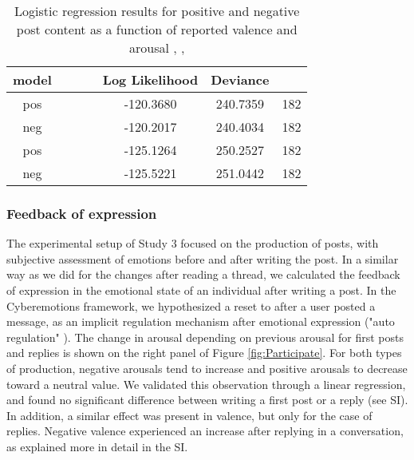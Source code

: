 \documentclass[nologo,url,11pt,a4paper]{ETHpaper}
\begin{document}
\begin{table}[!ht]
\centering

\begin{tabular}{ c | c  c  c  | c c c }
model &  					&  &  & Log Likelihood & Deviance  &    \\ \hline 
pos   &  	&   & &  -120.3680 &  240.7359 & 182 \\
neg   &                 &  & &  -120.2017 & 240.4034 & 182 \\
pos   &   &  &  & -125.1264 & 250.2527 & 182 \\
neg   &   &  &  & -125.5221 & 251.0442 & 182 \\

\end{tabular}
\caption{Logistic regression results for positive and negative post content as a function of reported valence and arousal   , ,
\label{tab:Expressionregs}}
\end{table}

\subsubsection{Feedback of expression}

The experimental setup of Study 3 focused on the production of posts, with
subjective assessment of emotions before and after writing the post. In a
similar way as we did for the changes after reading a thread, we calculated
the feedback of expression in the emotional state of an individual
after writing a post. In the Cyberemotions framework,
we hypothesized a reset to  after a user posted a message, as an implicit
regulation mechanism after emotional expression ("auto regulation" \cite{Kappas2011,Kappas2013b}). The change in arousal
depending on previous arousal for first posts and replies is shown on the
right panel of  Figure \ref{fig:Participate}. For both types of production,
negative arousals tend to increase and positive arousals to decrease toward a
neutral value. We validated this observation through a linear regression, and
found no significant difference between writing a first post or a reply (see
SI). In addition, a similar effect was present in valence, but only for the
case of replies. Negative valence experienced an increase after replying in a conversation, as explained more in detail in the SI.
\end{document}
